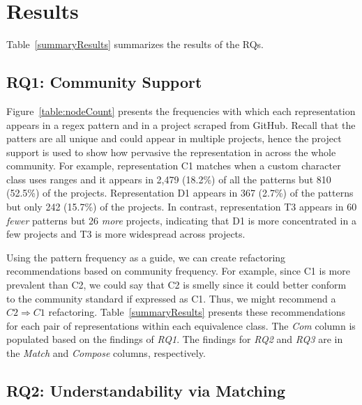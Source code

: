 
\section{Results}
\label{sec:results}
Table~\ref{summaryResults} summarizes the results of the RQs.  



\subsection{RQ1: Community Support}
Figure~\ref{table:nodeCount} presents the frequencies with which each representation appears in a regex pattern and in a project scraped from GitHub. Recall that the patters are all unique and could appear in multiple projects, hence the project support is used to show how pervasive the representation in across the whole community. For example, representation C1 matches when a custom character class uses ranges and it appears in 2,479 (18.2\%) of all the patterns but 810 (52.5\%) of the projects. Representation D1 appears in 367 (2.7\%) of the patterns but only 242 (15.7\%) of the projects. In contrast, representation T3 appears in 60 \emph{fewer} patterns but 26 \emph{more} projects, indicating that D1 is more concentrated in a few projects and T3 is more widespread across projects. 

Using the pattern frequency as a guide, we can create refactoring recommendations based on community frequency. For example, since C1 is more prevalent than C2, we could say that C2 is smelly since it could better conform to the community standard if expressed as C1. Thus, we might recommend a $C2 \Rightarrow C1$ refactoring. Table~\ref{summaryResults} presents these recommendations for each pair of representations within each equivalence class. The \emph{Com} column is populated based on the findings of \emph{RQ1}. The findings for \emph{RQ2} and \emph{RQ3} are in the \emph{Match} and \emph{Compose} columns, respectively. 


\subsection{RQ2: Understandability via Matching}

